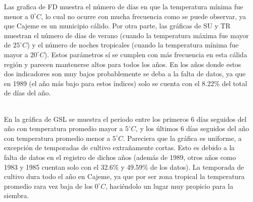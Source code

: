 \documentclass[letterpaper,12pt]{article}
\begin{document}
Las grafica de FD muestra el número de días en que la temperatura mínima fue menor a $0^\circ C$, lo cual no ocurre con mucha frecuencia como se puede observar, ya que Cajeme es un municipio cálido. Por otra parte, las gráficas de SU y TR muestran el número de días de verano (cuando la temperatura máxima fue mayor de $25^\circ C$) y el número de noches tropicales (cuando la temperatura mínima fue mayor a $20^\circ C$). Estos parámetros sí se cumplen con más frecuencia en esta cálida región y parecen mantenerse altos para todos los años. En los años donde estos dos indicadores son muy bajos probablemente se deba a la falta de datos, ya que en 1989 (el año más bajo para estos índices) solo se cuenta con el 8.22\% del total de días del año.
\\
\\


\begin{figure}[H]
\centering
{}
\label{graf4}
\end{figure}

En la gráfica de GSL se muestra el periodo entre los primeros 6 días seguidos del año con temperatura promedio mayor a $5^\circ C$, y los últimos 6 días seguidos del año con temperatura promedio menor a $5^\circ C$. Pareciera que la gráfica es uniforme, a excepción de temporadas de cultivo extrañamente cortas. Esto es debido a la falta de datos en el registro de dichos años (además de 1989, otros años como 1983 y 1985 cuentan solo con el 32.6\% y 49.59\% de los datos). La temporada de cultivo dura todo el año en Cajeme, ya que por ser zona tropical la temperatura promedio rara vez baja de los $0^\circ C$, haciéndolo un lugar muy propicio para la siembra.


\\
\\
\end{document}
